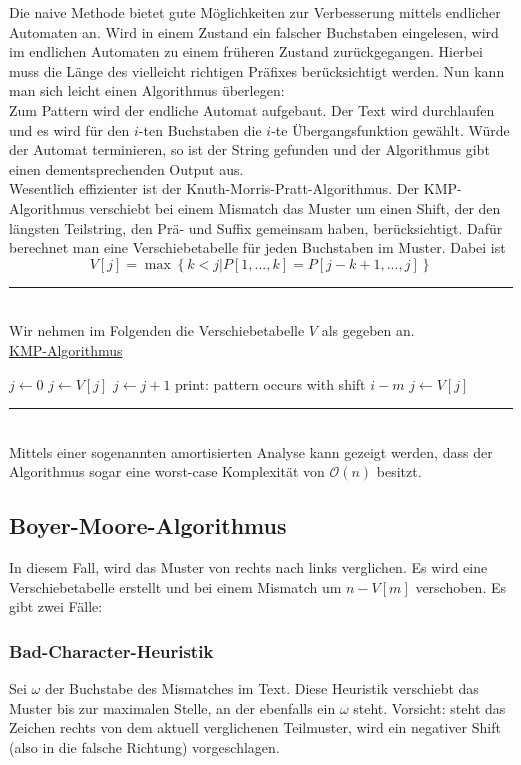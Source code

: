\documentclass[a4paper, 12pt]{article}
\begin{document}
	Die naive Methode bietet gute Möglichkeiten zur Verbesserung mittels endlicher Automaten an. Wird in einem Zustand ein falscher Buchstaben eingelesen, wird im endlichen Automaten zu einem früheren Zustand zurückgegangen. Hierbei muss die Länge des vielleicht richtigen Präfixes berücksichtigt werden. Nun kann man sich leicht einen Algorithmus überlegen:\\
	Zum Pattern wird der endliche Automat aufgebaut. Der Text wird durchlaufen und es wird für den $i$-ten Buchstaben die $i$-te Übergangsfunktion gewählt. Würde der Automat terminieren, so ist der String gefunden und der Algorithmus gibt einen dementsprechenden Output aus.\\
	
	Wesentlich effizienter ist der Knuth-Morris-Pratt-Algorithmus. Der KMP-Algorithmus verschiebt bei einem Mismatch das Muster um einen Shift, der den längsten Teilstring, den Prä- und Suffix gemeinsam haben, berücksichtigt. Dafür berechnet man eine Verschiebetabelle für jeden Buchstaben im Muster. Dabei ist \[V[j] = \max\left\{k<j | P[1,...,k] = P[j-k+1,...,j]\right\}\]
	\par\noindent\rule{\textwidth}{0.4pt}\\
	Wir nehmen im Folgenden die Verschiebetabelle $V$ als gegeben an.\\
	\underline{KMP-Algorithmus}
	\begin{algorithmic}[1]
		\State $j \gets 0$
		\State $j \gets V[j]$
		\EndWhile
		\State $j \gets j + 1$
		\EndIf
		\State print: pattern occurs with shift $i-m$
		\State $j \gets V[j]$
		\EndIf
		\EndFor
	\end{algorithmic}
	\par\noindent\rule{\textwidth}{0.4pt}\\
	Mittels einer sogenannten amortisierten Analyse kann gezeigt werden, dass der Algorithmus sogar eine worst-case Komplexität von $\mathcal{O}(n)$ besitzt.
	\subsection{Boyer-Moore-Algorithmus}
	In diesem Fall, wird das Muster von rechts nach links verglichen. Es wird eine Verschiebetabelle erstellt und bei einem Mismatch um $n-V[m]$ verschoben. Es gibt zwei Fälle: \subsubsection{Bad-Character-Heuristik}
	Sei $\omega$ der Buchstabe des Mismatches im Text. Diese Heuristik verschiebt das Muster bis zur maximalen Stelle, an der ebenfalls ein $\omega$ steht. Vorsicht: steht das Zeichen rechts von dem aktuell verglichenen Teilmuster, wird ein negativer Shift (also in die falsche Richtung) vorgeschlagen. 
\end{document}
